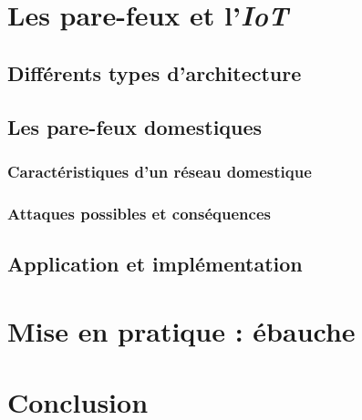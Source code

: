 \documentclass[]{article}
\begin{document}
\section{Les pare-feux et l'\textit{IoT}}

\subsection{Différents types d'architecture}

\subsection{Les pare-feux domestiques}

\subsubsection{Caractéristiques d'un réseau domestique}

\subsubsection{Attaques possibles et conséquences}

\subsection{Application et implémentation}

\section{Mise en pratique : ébauche}
\newpage
\section*{Conclusion}




\end{document}
